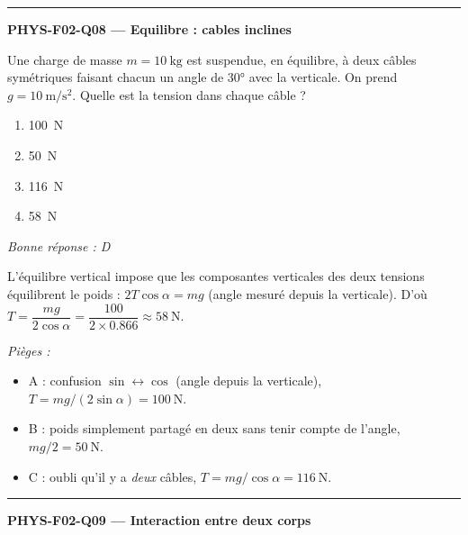 \documentclass[11pt,a4paper]{article}
\begin{document}
\vspace{8pt}\hrule\vspace{8pt}
\noindent\textbf{PHYS-F02-Q08 --- Equilibre : cables inclines}\par
Une charge de masse $m=\qty{10}{\kilogram}$ est suspendue, en équilibre, à deux câbles symétriques faisant chacun un angle de \ang{30} avec la verticale. On prend $g=\qty{10}{\metre\per\second\squared}$. Quelle est la tension dans chaque câble ?
\begin{center}
\end{center}
\begin{enumerate}[label=\Alph*)]
\item \qty{100}{\newton}
\item \qty{50}{\newton}
\item \qty{116}{\newton}
\item \qty{58}{\newton}
\end{enumerate}
\textit{Bonne réponse : D}\par
L'équilibre vertical impose que les composantes verticales des deux tensions équilibrent le poids : $2T\cos\alpha=mg$ (angle mesuré depuis la verticale). D'où $T=\dfrac{mg}{2\cos\alpha}=\dfrac{100}{2\times\num{0.866}}\approx\qty{58}{\newton}$.\par
\textit{Pièges :}
\begin{itemize}
\item A : confusion $\sin\leftrightarrow\cos$ (angle depuis la verticale), $T=mg/(2\sin\alpha)=\qty{100}{\newton}$.
\item B : poids simplement partagé en deux sans tenir compte de l'angle, $mg/2=\qty{50}{\newton}$.
\item C : oubli qu'il y a \emph{deux} câbles, $T=mg/\cos\alpha=\qty{116}{\newton}$.
\end{itemize}
\vspace{8pt}\hrule\vspace{8pt}
\noindent\textbf{PHYS-F02-Q09 --- Interaction entre deux corps}\par
\end{document}

